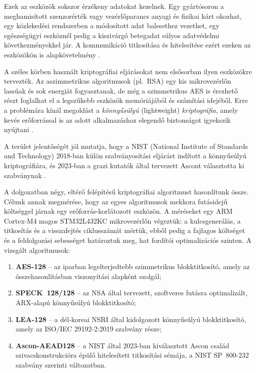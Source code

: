 \documentclass[a4paper,12pt]{report}
\theoremstyle{definition}
\theoremstyle{remark}
\begin{document}
Ezek az eszközök sokszor érzékeny adatokat kezelnek. Egy gyártósoron a meghamisított szenzorérték vagy vezérlőparancs anyagi és fizikai kárt okozhat, egy közlekedési rendszerben a módosított adat balesethez vezethet, egy egészségügyi eszköznél pedig a kiszivárgó betegadat súlyos adatvédelmi következményekkel jár. A kommunikáció titkosítása és hitelesítése ezért ezeken az eszközökön is alapkövetelmény \cite{Hossain2015}.

A széles körben használt kriptográfiai eljárásokat nem elsősorban ilyen eszközökre tervezték. Az aszimmetrikus algoritmusok (pl.~RSA) egy kis mikrovezérlőn lassúak és sok energiát fogyasztanak, de még a szimmetrikus AES is érezhető részt foglalhat el a legszűkebb eszközök memóriájából és számítási idejéből. Erre a problémára kínál megoldást a \emph{könnyűsúlyú} (lightweight) \emph{kriptográfia}, amely kevés erőforrással is az adott alkalmazáshoz elegendő biztonságot igyekszik nyújtani \cite{NISTIR8114}.

A terület jelentőségét jól mutatja, hogy a NIST (National Institute of Standards and Technology) 2018-ban külön szabványosítási eljárást indított a könnyűsúlyú kriptográfiára, és 2023-ban a grazi kutatók által tervezett Ascont választotta ki szabványnak \cite{NISTLWC2023}.

\bigskip

A dolgozatban négy, eltérő felépítésű kriptográfiai algoritmust hasonlítunk össze. Célunk annak megmérése, hogy az egyes algoritmusok mekkora futásidejű költséggel járnak egy erőforrás-korlátozott eszközön. A méréseket egy ARM Cortex-M4 magos STM32L432KC mikrovezérlőn végeztük: a kulcsgenerálás, a titkosítás és a visszafejtés ciklusszámát mértük, ebből pedig a fajlagos költséget és a feldolgozási sebességet határoztuk meg, hat fordítói optimalizációs szinten. A vizsgált algoritmusok:

\begin{enumerate}
	\item \textbf{AES-128} -- az iparban legelterjedtebb szimmetrikus blokktitkosító, amely az összehasonlításban viszonyítási alapként szolgál;
	\item \textbf{SPECK~128/128} -- az NSA által tervezett, szoftveres futásra optimalizált, ARX-alapú könnyűsúlyú blokktitkosító;
	\item \textbf{LEA-128} -- a dél-koreai NSRI által kidolgozott könnyűsúlyú blokktitkosító, amely az ISO/IEC 29192-2:2019 szabvány része;
	\item \textbf{Ascon-AEAD128} -- a NIST által 2023-ban kiválasztott Ascon család szivacskonstrukcióra épülő hitelesített titkosítási sémája, a NIST SP~800-232 szabvány szerinti változatban.
\end{enumerate}
\end{document}
